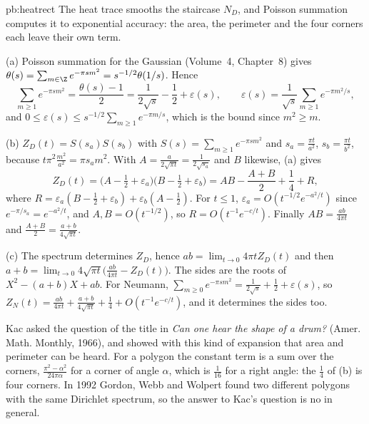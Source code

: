 \begin{solution}{pb:heatrect}
\idea The heat trace smooths the staircase $N_D$, and Poisson summation computes it to exponential accuracy: the area, the perimeter and the four corners each leave their own term.

\writeup (a) Poisson summation for the Gaussian (Volume~4, Chapter~8) gives $\theta(s)=\sum_{m\in\Z}e^{-\pi sm^2}=s^{-1/2}\theta(1/s)$. Hence
\[
\sum_{m\ge1}e^{-\pi sm^2}=\frac{\theta(s)-1}2=\frac1{2\sqrt s}-\frac12+\varepsilon(s),\qquad\varepsilon(s)=\frac1{\sqrt s}\sum_{m\ge1}e^{-\pi m^2/s},
\]
and $0\le\varepsilon(s)\le s^{-1/2}\sum_{m\ge1}e^{-\pi m/s}$, which is the bound since $m^2\ge m$.

(b) $Z_D(t)=S(s_a)S(s_b)$ with $S(s)=\sum_{m\ge1}e^{-\pi sm^2}$ and $s_a=\frac{\pi t}{a^2}$, $s_b=\frac{\pi t}{b^2}$, because $t\pi^2\frac{m^2}{a^2}=\pi s_am^2$. With $A=\frac a{2\sqrt{\pi t}}=\frac1{2\sqrt{s_a}}$
and $B$ likewise, (a) gives
\[
Z_D(t)=\bigl(A-\tfrac12+\varepsilon_a\bigr)\bigl(B-\tfrac12+\varepsilon_b\bigr)=AB-\frac{A+B}2+\frac14+R,
\]
where $R=\varepsilon_a(B-\frac12+\varepsilon_b)+\varepsilon_b(A-\frac12)$. For $t\le1$, $\varepsilon_a=O(t^{-1/2}e^{-a^2/t})$ since $e^{-\pi/s_a}=e^{-a^2/t}$, and $A,B=O(t^{-1/2})$, so
$R=O(t^{-1}e^{-c/t})$. Finally $AB=\frac{ab}{4\pi t}$ and $\frac{A+B}2=\frac{a+b}{4\sqrt{\pi t}}$.

(c) The spectrum determines $Z_D$, hence $ab=\lim_{t\to0}4\pi tZ_D(t)$ and then $a+b=\lim_{t\to0}4\sqrt{\pi t}\bigl(\frac{ab}{4\pi t}-Z_D(t)\bigr)$. The sides are the roots of $X^2-(a+b)X+ab$.
For Neumann, $\sum_{m\ge0}e^{-\pi sm^2}=\frac1{2\sqrt s}+\frac12+\varepsilon(s)$, so $Z_N(t)=\frac{ab}{4\pi t}+\frac{a+b}{4\sqrt{\pi t}}+\frac14+O(t^{-1}e^{-c/t})$, and it determines the sides too.

\leads Kac asked the question of the title in \emph{Can one hear the shape of a drum?} (Amer. Math. Monthly, 1966), and showed with this kind of expansion that area and perimeter can be heard.
For a polygon the constant term is a sum over the corners, $\frac{\pi^2-\alpha^2}{24\pi\alpha}$ for a corner of angle $\alpha$, which is $\frac1{16}$ for a right angle: the $\frac14$ of (b) is four corners.
In 1992 Gordon, Webb and Wolpert found two different polygons with the same Dirichlet spectrum, so the answer to Kac's question is no in general.
\end{solution}

